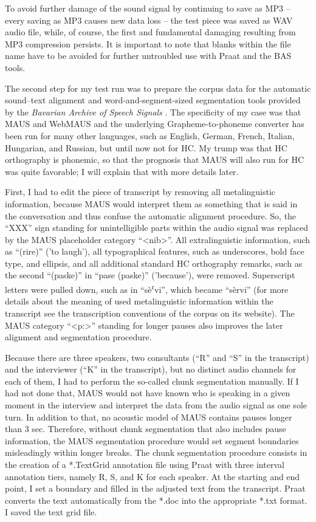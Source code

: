 \documentclass[output=paper]{langsci/langscibook}
\begin{document}
To avoid further damage of the sound signal by continuing to save as MP3 – every saving as MP3 causes new data loss – the test piece was saved as WAV audio file, while, of course, the first and fundamental damaging resulting from MP3 compression persists. It is important to note that blanks within the file name have to be avoided for further untroubled use with Praat and the BAS tools.

The second step for my test run was to prepare the corpus data for the automatic sound–text alignment and word-and-segment-sized segmentation tools provided by the \textit{Bavarian Archive of Speech Signals} \citep{kisler2017MAUS}. The specificity of my case was that MAUS and WebMAUS \citep{Kisler2012} and the underlying Grapheme-to-phoneme converter \citep{Reichel.2012} has been run for many other languages, such as English, German, French, Italian, Hungarian, and Russian, but until now not for HC. My trump was that HC orthography is phonemic, so that the prognosis that MAUS will also run for HC was quite favorable; I will explain that with more details later. 

First, I had to edit the piece of transcript by removing all metalinguistic information, because MAUS would interpret them as something that is said in the conversation and thus confuse the automatic alignment procedure. So, the “XXX” sign standing for unintelligible parts within the audio signal was replaced by the MAUS placeholder category “<nib>”. All extralinguistic information, such as “(rire)” ('to laugh'), all typographical features, such as underscores, bold face type, and ellipsis, and all additional standard HC orthography remarks, such as the second “(paske)” in “pase (paske)” ('because'), were removed. Superscript letters were pulled down, such as in “sè\textsuperscript{r}vi”, which became “sèrvi” (for more details about the meaning of used metalinguistic information within the transcript see the transcription conventions of the corpus on its website). The MAUS category “<p:>” standing for longer pauses also improves the later alignment and segmentation procedure.

Because there are three speakers, two consultants (“R” and “S” in the transcript) and the interviewer (“K” in the transcript), but no distinct audio channels for each of them, I had to perform the so-called chunk segmentation manually. If I had not done that, MAUS would not have known who is speaking in a given moment in the interview and interpret the data from the audio signal as one sole turn. In addition to that, no acoustic model of MAUS contains pauses longer than 3 sec. Therefore, without chunk segmentation that also includes pause information, the MAUS segmentation procedure would set segment boundaries misleadingly within longer breaks. The chunk segmentation procedure consists in the creation of a *.TextGrid annotation file using Praat with three interval annotation tiers, namely R, S, and K for each speaker. At the starting and end point, I set a boundary and filled in the adjusted text from the transcript. Praat converts the text automatically from the *.doc into the appropriate *.txt format. I saved the text grid file.
\end{document}
